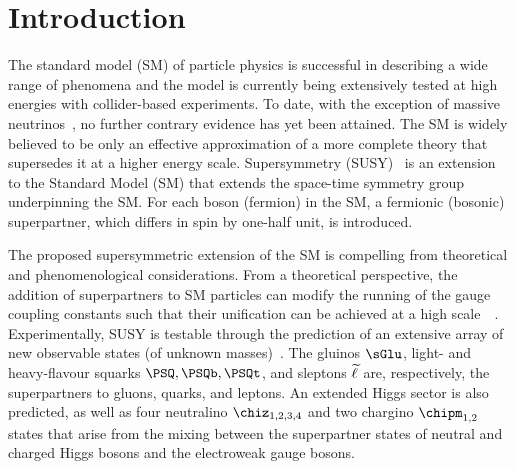 \section{Introduction}
\label{sec:introduction}

The standard model (SM) of particle physics is successful in
describing a wide range of phenomena and the model is currently being
extensively tested at high energies with collider-based experiments.
To date, with the exception of massive neutrinos~\cite{Fukuda:1998mi,
  Ahmad:2001an, Ahmad:2002jz}, no further contrary evidence has yet
been attained. The SM is widely believed to be only an effective
approximation of a more complete theory that supersedes it at a higher
energy scale. Supersymmetry (SUSY)~\cite{ref:SUSY-1, ref:SUSY0,
  ref:SUSY3, ref:SUSY1} is an extension to the Standard Model (SM)
that extends the space-time symmetry group underpinning the SM. For
each boson (fermion) in the SM, a fermionic (bosonic) superpartner,
which differs in spin by one-half unit, is introduced.

The proposed supersymmetric extension of the SM is compelling from
theoretical and phenomenological considerations. From a theoretical
perspective, the addition of superpartners to SM particles can modify
the running of the gauge coupling constants such that their
unification can be achieved at a high scale~~\cite{Dimopoulos:1981yj,
  Ibanez:1981yh, Marciano:1981un}.  Experimentally, SUSY is testable
through the prediction of an extensive array of new observable states
(of unknown masses)~\cite{ref:SUSY4, ref:SUSY2}. The gluinos $\sGlu$,
light- and heavy-flavour squarks $\PSQ, \PSQb, \PSQt$, and sleptons
$\widetilde{\ell}$ are, respectively, the superpartners to gluons, quarks, and
leptons. An extended Higgs sector is also predicted, as well as four
neutralino $\chiz_{1,2,3,4}$ and two chargino $\chipm_{1,2}$ states
that arise from the mixing between the superpartner states of neutral
and charged Higgs bosons and the electroweak gauge bosons.

